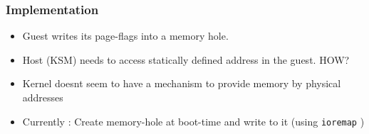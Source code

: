 \documentclass{beamer}
\begin{document}
\begin{frame}
  \frametitle{Implementation}
  \begin{itemize}
  \item Guest writes its page-flags into a memory hole. 
  \item Host (KSM) needs to access statically defined address in the guest. \alert{HOW?}
  \item Kernel doesnt seem to have a mechanism to provide memory by physical addresses
  \item \alert{Currently :} Create memory-hole at boot-time and write to it (using \texttt{ioremap} )
  \end{itemize}
\end{frame}
\end{document}

